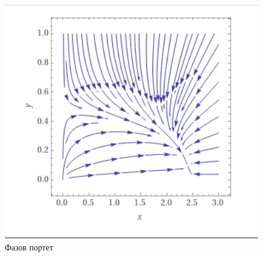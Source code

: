 \documentclass[a4paper,fleqn,12pt]{article}
\begin{document}
\begin{figure}[htp!]
\includegraphics [width=6in]{fazof-portret-primer-2.png}
\caption{Фазов портет}
\end{figure}
\end{document}
